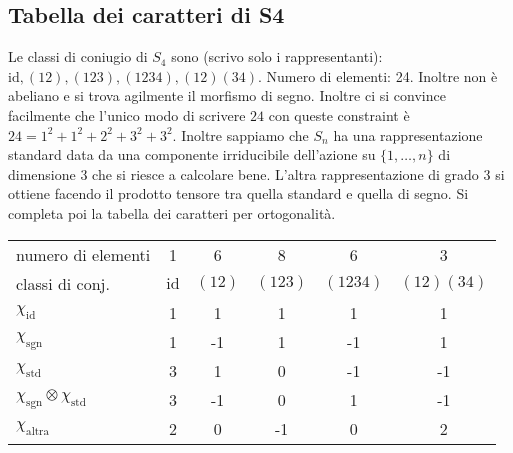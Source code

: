 \documentclass[a4paper,NoNotes,GeneralMath]{stdmdoc}
\begin{document}
	\subsection{Tabella dei caratteri di S4}
	Le classi di coniugio di $S_4$ sono (scrivo solo i rappresentanti): $\text{id}, (1 2), (1 2 3), (1 2 3 4), (1 2)(3 4)$. Numero di elementi: 24. Inoltre non è abeliano e si trova agilmente il morfismo di segno. Inoltre ci si convince facilmente che l'unico modo di scrivere $24$ con queste constraint è $24 = 1^2 + 1^2 + 2^2 + 3^2 + 3^2$. Inoltre sappiamo che $S_n$ ha una rappresentazione standard data da una componente irriducibile dell'azione su $\{1, \ldots, n\}$ di dimensione $3$ che si riesce a calcolare bene. L'altra rappresentazione di grado $3$ si ottiene facendo il prodotto tensore tra quella standard e quella di segno. Si completa poi la tabella dei caratteri per ortogonalità.
	\begin{center} \begin{tabular}{lccccc}
	numero di elementi & 1    & 6    & 8    & 6   & 3   \\
	classi di conj.    & $\text{id}$ & $(1 2)$ & $(1 2 3)$ & $(1 2 3 4)$ & $(1 2)(3 4)$ \\ \hline
	$\chi_\text{id}$   & 1    & 1    & 1    & 1   & 1   \\
	$\chi_\text{sgn}$  & 1    & -1   & 1    & -1  & 1   \\
	$\chi_\text{std}$  & 3    & 1    & 0    & -1  & -1  \\
	$\chi_\text{sgn} \otimes \chi_\text{std}$ & 3   & -1  & 0   & 1    & -1  \\
	$\chi_\text{altra}$ & 2   & 0    & -1   & 0   & 2   \\
	\end{tabular} \end{center} \vskip 0.5cm
	

\end{document}
